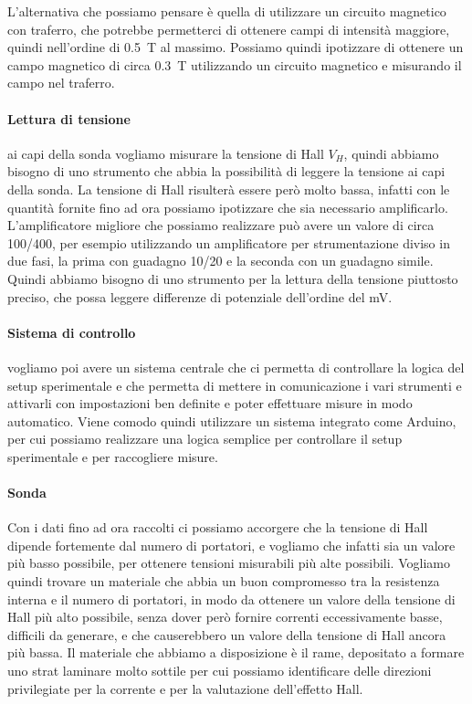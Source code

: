 \documentclass[fleqn,varvw,11pt,tightenlines]{memo}
\begin{document}
L'alternativa che possiamo pensare è quella di utilizzare un circuito magnetico con traferro, che potrebbe permetterci di ottenere campi di intensità maggiore, quindi nell'ordine di \SI{0.5}{\tesla} al massimo. Possiamo quindi ipotizzare di ottenere un campo magnetico di circa \SI{0.3}{\tesla} utilizzando un circuito magnetico e misurando il campo nel traferro.

\paragraph{Lettura di tensione} ai capi della sonda vogliamo misurare la tensione di Hall $V_H$, quindi abbiamo bisogno di uno strumento che abbia la possibilità di leggere la tensione ai capi della sonda. La tensione di Hall risulterà essere però molto bassa, infatti con le quantità fornite fino ad ora possiamo ipotizzare che sia necessario amplificarlo. L'amplificatore migliore che possiamo realizzare può avere un valore di circa 100/400, per esempio utilizzando un amplificatore per strumentazione diviso in due fasi, la prima con guadagno 10/20 e la seconda con un guadagno simile. Quindi abbiamo bisogno di uno strumento per la lettura della tensione piuttosto preciso, che possa leggere differenze di potenziale dell'ordine del \si{\milli\volt}. 

\paragraph{Sistema di controllo} vogliamo poi avere un sistema centrale che ci permetta di controllare la logica del setup sperimentale e che permetta di mettere in comunicazione i vari strumenti e attivarli con impostazioni ben definite e poter effettuare misure in modo automatico. Viene comodo quindi utilizzare un sistema integrato come Arduino, per cui possiamo realizzare una logica semplice per controllare il setup sperimentale e per raccogliere misure. 

\paragraph{Sonda} Con i dati fino ad ora raccolti ci possiamo accorgere che la tensione di Hall dipende fortemente dal numero di portatori, e vogliamo che infatti sia un valore più basso possibile, per ottenere tensioni misurabili più alte possibili. Vogliamo quindi trovare un materiale che abbia un buon compromesso tra la resistenza interna e il numero di portatori, in modo da ottenere un valore della tensione di Hall più alto possibile, senza dover però fornire correnti eccessivamente basse, difficili da generare, e che causerebbero un valore della tensione di Hall ancora più bassa. Il materiale che abbiamo a disposizione è il rame, depositato a formare uno strat laminare molto sottile per cui possiamo identificare delle direzioni privilegiate per la corrente e per la valutazione dell'effetto Hall. 
\end{document}
